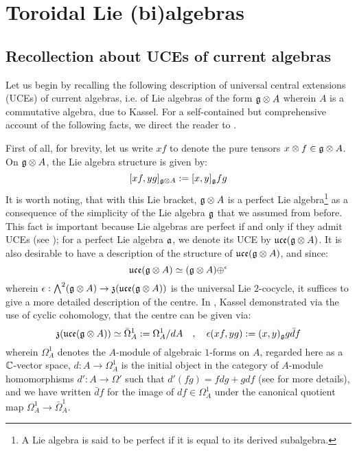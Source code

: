 \section{Toroidal Lie (bi)algebras}
    \subsection{Recollection about UCEs of current algebras}
        Let us begin by recalling the following description of universal central extensions (UCEs) of current algebras, i.e. of Lie algebras of the form $\g \tensor A$ wherein $A$ is a commutative algebra, due to Kassel. For a self-contained but comprehensive account of the following facts, we direct the reader to \cite[Section 2.2]{msc_thesis_gamma_extended_toroidal_lie_algebras}.
        
        First of all, for brevity, let us write $xf$ to denote the pure tensors $x \tensor f \in \g \tensor A$. On $\g \tensor A$, the Lie algebra structure is given by:
            $$[xf, yg]_{\g \tensor A} := [x, y]_{\g} fg$$
        It is worth noting, that with this Lie bracket, $\g \tensor A$ is a perfect Lie algebra\footnote{A Lie algebra is said to be perfect if it is equal to its derived subalgebra.} as a consequence of the simplicity of the Lie algebra $\mathfrak{g}$ that we assumed from before. This fact is important because Lie algebras are perfect if and only if they admit UCEs (see \cite[Lemma 1.10]{garland_arithmetics_of_loop_groups}); for a perfect Lie algebra $\mathfrak{a}$, we denote its UCE by $\uce(\g \tensor A)$. It is also desirable to have a description of the structure of $\uce(\g \tensor A)$, and since:
            $$\uce(\g \tensor A) \cong ( \g \tensor A ) \oplus^{\e} $$
        wherein $\e: \bigwedge^2 (\g \tensor A) \to \z( \uce(\g \tensor A) )$ is the universal Lie $2$-cocycle, it suffices to give a more detailed description of the centre. In \cite{kassel_universal_central_extensions_of_lie_algebras}, Kassel demonstrated via the use of cyclic cohomology, that the centre can be given via:
            $$\z( \uce(\g \tensor A) ) \cong \bar{\Omega}^1_A := \Omega^1_A/dA \quad, \quad \e(xf, yg) := (x, y)_{\g} g \bar{d}f$$
        wherein $\Omega^1_A$ denotes the $A$-module of algebraic $1$-forms on $A$, regarded here as a $\mathbb{C}$-vector space, $d: A \to \Omega^1_A$ is the initial object in the category of $A$-module homomorphisms $d': A \to \Omega'$ such that $d'(fg) = fdg + gdf$ (see \cite[\href{https://stacks.math.columbia.edu/tag/00RM}{Tag 00RM}]{stacks-project} for more details), and we have written $\bar{d}f$ for the image of $df \in \Omega^1_A$ under the canonical quotient map $\Omega^1_A \to \bar{\Omega}^1_A$.

